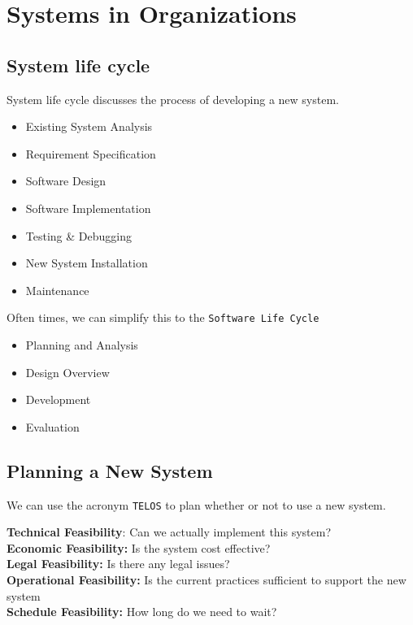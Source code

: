 \documentclass[../notes.tex]{subfiles}
\begin{document}
\section{Systems in Organizations}

\subsection{System life cycle}
System life cycle discusses the process of developing a new system.

\begin{itemize}
	\item Existing System Analysis
	\item Requirement Specification
	\item Software Design
	\item Software Implementation
	\item Testing \& Debugging
	\item New System Installation 
	\item Maintenance
\end{itemize}

Often times, we can simplify this to the \texttt{Software Life Cycle}
\begin{itemize}
	\item Planning and Analysis
	\item Design Overview
	\item Development
	\item Evaluation
\end{itemize}

\subsection{Planning a New System}
We can use the acronym \texttt{TELOS} to plan whether or not to use a new system.

\vspace{1em}

\noindent \textbf{Technical Feasibility}: Can we actually implement this system? \\
\noindent \textbf{Economic Feasibility:} Is the system cost effective? \\
\noindent \textbf{Legal Feasibility:} Is there any legal issues? \\
\noindent \textbf{Operational Feasibility:} Is the current practices sufficient to support the new system \\ \noindent \textbf{Schedule Feasibility:} How long do we need to wait? \\
\end{document}
